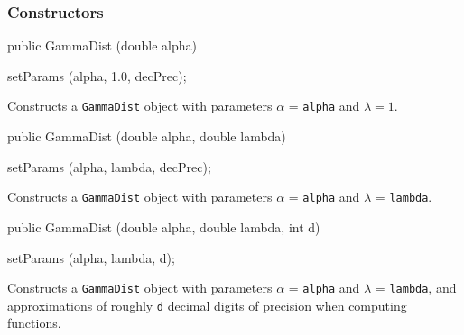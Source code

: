 \subsubsection* {Constructors}

\begin{code}

   public GammaDist (double alpha)\begin{hide} {
      setParams (alpha, 1.0, decPrec);
   }\end{hide}
\end{code}
  \begin{tabb} Constructs a \texttt{GammaDist} object with parameters
  $\alpha$ = \texttt{alpha} and $\lambda=1$.
  \end{tabb}
\begin{code}

   public GammaDist (double alpha, double lambda)\begin{hide} {
      setParams (alpha, lambda, decPrec);
   }\end{hide}
\end{code}
  \begin{tabb} Constructs a \texttt{GammaDist} object with parameters
  $\alpha$ = \texttt{alpha}  and $\lambda$ = \texttt{lambda}.
  \end{tabb}
\begin{code}

   public GammaDist (double alpha, double lambda, int d)\begin{hide} {
      setParams (alpha, lambda, d);
   }\end{hide}
\end{code}
\begin{tabb}
   Constructs a \texttt{GammaDist} object with parameters $\alpha$ =
   \texttt{alpha} and  $\lambda$ = \texttt{lambda}, and approximations of
   roughly \texttt{d} decimal digits of precision when computing functions.
\end{tabb}

